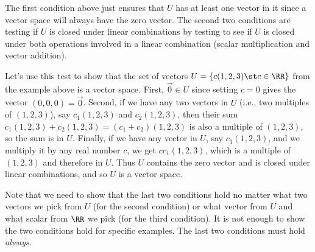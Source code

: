 The first condition above just ensures that $U$ has at least one vector in it since a vector space will always have the zero vector.  The second two conditions are testing if $U$ is closed under linear combinations by testing to see if $U$ is closed under both operations involved in a linear combination (scalar multiplication and vector addition).

\begin{example}
  Let's use this test to show that the set of vectors $U=\{c(1,2,3)\st
  c\in\RR\}$ from the example above is a vector space.  First, $\vec
  0\in U$ since setting $c=0$ gives the vector $(0,0,0)=\vec 0$.
  Second, if we have any two vectors in $U$ (i.e., two multiples of
  $(1,2,3)$), say $c_1(1,2,3)$ and $c_2(1,2,3)$, then their sum
  $c_1(1,2,3)+c_2(1,2,3)=(c_1+c_2)(1,2,3)$ is also a multiple of
  $(1,2,3)$, so the sum is in $U$.  Finally, if we have any vector in
  $U$, say $c_1(1,2,3)$, and we multiply it by any real number $c$, we
  get $cc_1(1,2,3)$, which is a multiple of $(1,2,3)$ and therefore in
  $U$.  Thus $U$ contains the zero vector and is closed under linear
  combinations, and so $U$ is a vector space.

  Note that we need to show that the last two conditions hold no matter what two vectors we pick from $U$ (for the second condition) or what vector from $U$ and what scalar from $\RR$ we pick (for the third condition).  It is not enough to show the two conditions hold for specific examples.  The last two conditions must hold \emph{always}.
\end{example}

